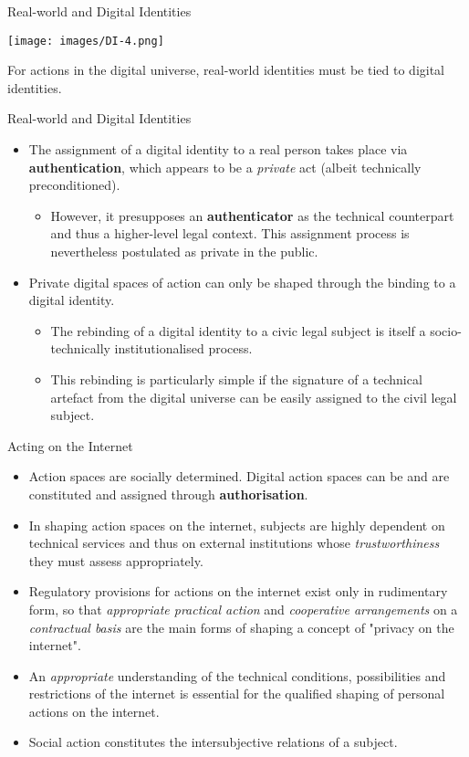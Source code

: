 \documentclass{beamer}
\begin{document}
\begin{frame}{Real-world and Digital Identities}
  \begin{center}
    \texttt{[image: images/DI-4.png]}
  \end{center}
  For actions in the digital universe, real-world identities must be tied to
  digital identities.
\end{frame}
\begin{frame}{Real-world and Digital Identities}
\begin{itemize}
\item The assignment of a digital identity to a real person takes place via
  \textbf{authentication}, which appears to be a \emph{private} act (albeit
  technically preconditioned).
  \begin{itemize}
  \item However, it presupposes an \textbf{authenticator} as the technical
    counterpart and thus a higher-level legal context. This assignment process
    is nevertheless postulated as private in the public.
  \end{itemize}
\item Private digital spaces of action can only be shaped through the
  binding to a digital identity.
  \begin{itemize}
  \item The rebinding of a digital identity to a civic legal subject is itself
    a socio-technically institutionalised process.
  \item This rebinding is particularly simple if the signature of a technical
    artefact from the digital universe can be easily assigned to the civil
    legal subject.
  \end{itemize}
\end{itemize}
\end{frame}
\begin{frame}{Acting on the Internet}\small
\begin{itemize}
\item Action spaces are socially determined. Digital action spaces can be and
  are constituted and assigned through \textbf{authorisation}.
\item In shaping action spaces on the internet, subjects are highly dependent
  on technical services and thus on external institutions whose
  \emph{trustworthiness} they must assess appropriately.
\item Regulatory provisions for actions on the internet exist only in
  rudimentary form, so that \emph{appropriate practical action} and
  \emph{cooperative arrangements} on a \emph{contractual basis} are the main
  forms of shaping a concept of "privacy on the internet".
\item An \emph{appropriate} understanding of the technical conditions,
  possibilities and restrictions of the internet is essential for the
  qualified shaping of personal actions on the internet.
\item Social action constitutes the intersubjective relations of a subject.
\end{itemize}
\end{frame}
\end{document}
